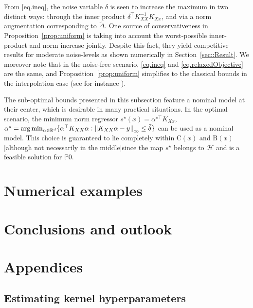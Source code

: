 From \eqref{eq.ineq}, the noise variable $\delta$ is seen to increase the maximum in two distinct ways: through the inner product $\delta^\top K_{XX}^{-1}K_{Xx}$, and via a norm augmentation corresponding to $\tilde\Delta$. One source of conservativeness in Proposition~\ref{prop:uniform} is taking into account the worst-possible inner-product and norm increase jointly. Despite this fact, they yield competitive results for moderate noise-levels as shown numerically in Section~\ref{sec::Result}. We moreover note that in the noise-free scenario, \eqref{eq.ineq} and \eqref{eq.relaxedObjective} are the same, and Proposition~\ref{prop:uniform} simplifies to the classical bounds in the interpolation case (see for instance \cite{fasshauer2011positive}).

\begin{remark}
	The sub-optimal bounds presented in this subsection feature a nominal model at their center, which is desirable in many practical situations. In the optimal scenario, the minimum norm regressor $s^\star(x) = \alpha^{\star\top} K_{Xx}$, $\alpha^\star = \text{arg}\min_{\alpha \in \mathbb{R}^d} \{ \alpha^\top K_{XX} \alpha : \left\| K_{XX} \alpha - y \right\|_\infty \leq \bar\delta \}$ can be used as a nominal model. This choice is guaranteed to lie completely within $\text{C}(x)$ and $\text{B}(x)$|although not necessarily in the middle|since the map $s^\star$ belongs to $\mathcal{H}$ and is a feasible solution for $\mathds{P}0$.
\end{remark}

\section{Numerical examples}



\section{Conclusions and outlook}

\section{Appendices}

\subsection{Estimating kernel hyperparameters}

